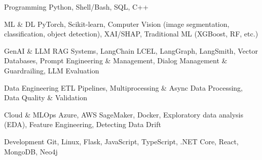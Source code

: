 

\begin{cvskills}


\cvskill
    {Programming} %
    {Python, Shell/Bash, SQL, C++} %


\cvskill
    {ML \& DL}
    {PyTorch, Scikit-learn, Computer Vision (image segmentation, classification, object detection), XAI/SHAP, Traditional ML (XGBoost, RF, etc.)}


\cvskill
    {GenAI \& LLM}
    {RAG Systems, LangChain LCEL, LangGraph, LangSmith, Vector Databases, Prompt Engineering \& Management, Dialog Management \& Guardrailing, LLM Evaluation}



\cvskill
    {Data Engineering}
    {ETL Pipelines, Multiprocessing \& Async Data Processing, Data Quality \& Validation}
    

\cvskill
    {Cloud \& MLOps}
    {Azure, AWS SageMaker, Docker, Exploratory data analysis (EDA), Feature Engineering, Detecting Data Drift}

    

\cvskill
    {Development}
    {Git, Linux, Flask, JavaScript, TypeScript, .NET Core, React, MongoDB, Neo4j}






    
\end{cvskills}

